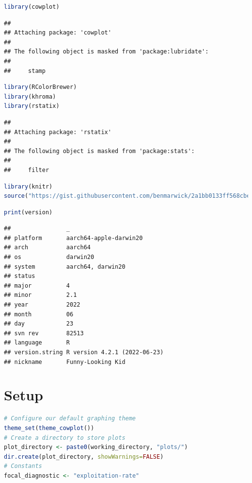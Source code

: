 \documentclass[
]{book}
\begin{document}
\begin{lstlisting}[language=R]
library(cowplot)
\end{lstlisting}

\begin{lstlisting}
## 
## Attaching package: 'cowplot'
## 
## The following object is masked from 'package:lubridate':
## 
##     stamp
\end{lstlisting}

\begin{lstlisting}[language=R]
library(RColorBrewer)
library(khroma)
library(rstatix)
\end{lstlisting}

\begin{lstlisting}
## 
## Attaching package: 'rstatix'
## 
## The following object is masked from 'package:stats':
## 
##     filter
\end{lstlisting}

\begin{lstlisting}[language=R]
library(knitr)
source("https://gist.githubusercontent.com/benmarwick/2a1bb0133ff568cbe28d/raw/fb53bd97121f7f9ce947837ef1a4c65a73bffb3f/geom_flat_violin.R")
\end{lstlisting}

\begin{lstlisting}[language=R]
print(version)
\end{lstlisting}

\begin{lstlisting}
##                _                           
## platform       aarch64-apple-darwin20      
## arch           aarch64                     
## os             darwin20                    
## system         aarch64, darwin20           
## status                                     
## major          4                           
## minor          2.1                         
## year           2022                        
## month          06                          
## day            23                          
## svn rev        82513                       
## language       R                           
## version.string R version 4.2.1 (2022-06-23)
## nickname       Funny-Looking Kid
\end{lstlisting}

\hypertarget{setup}{%
\section{Setup}\label{setup}}

\begin{lstlisting}[language=R]
# Configure our default graphing theme
theme_set(theme_cowplot())
# Create a directory to store plots
plot_directory <- paste0(working_directory, "plots/")
dir.create(plot_directory, showWarnings=FALSE)
# Constants
focal_diagnostic <- "exploitation-rate"
\end{lstlisting}
\end{document}
